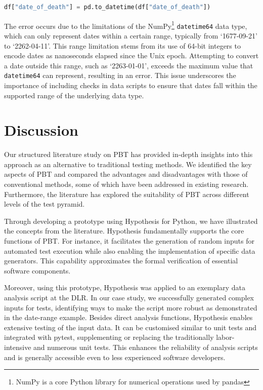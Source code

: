 \documentclass[runningheads]{llncs}
\begin{document}
\begin{lstlisting}[language=Python,caption={Trace Out Of Bounds Error from \texttt{data\_analysis.ipynb}},label=lst:bounds_err,firstnumber=10]
df["date_of_death"] = pd.to_datetime(df["date_of_death"])
\end{lstlisting}
The error occurs due to the limitations of the NumPy\footnote{NumPy is a core Python library for numerical operations used by pandas} \texttt{datetime64} data type, which can only represent dates within a certain range, typically from `1677-09-21' to `2262-04-11'. This range limitation stems from its use of 64-bit integers to encode dates as nanoseconds elapsed since the Unix epoch. Attempting to convert a date outside this range, such as `2263-01-01', exceeds the maximum value that \texttt{datetime64} can represent, resulting in an error. This issue underscores the importance of including checks in data scripts to ensure that dates fall within the supported range of the underlying data type.

\section{Discussion}
Our structured literature study on PBT has provided in-depth insights into this approach as an alternative to traditional testing methods. We identified the key aspects of PBT and compared the advantages and disadvantages with those of conventional methods, some of which have been addressed in existing research. Furthermore, the literature has explored the suitability of PBT across different levels of the test pyramid.

Through developing a prototype using Hypothesis for Python, we have illustrated the concepts from the literature. Hypothesis fundamentally supports the core functions of PBT. For instance, it facilitates the generation of random inputs for automated test execution while also enabling the implementation of specific data generators. This capability approximates the formal verification of essential software components.

Moreover, using this prototype, Hypothesis was applied to an exemplary data analysis script at the DLR. In our case study, we successfully generated complex inputs for tests, identifying ways to make the script more robust as demonstrated in the date-range example. Besides direct analysis functions, Hypothesis enables extensive testing of the input data. It can be customised similar to unit tests and integrated with pytest, supplementing or replacing the traditionally labor-intensive and numerous unit tests. This enhances the reliability of analysis scripts and is generally accessible even to less experienced software developers.
\end{document}
